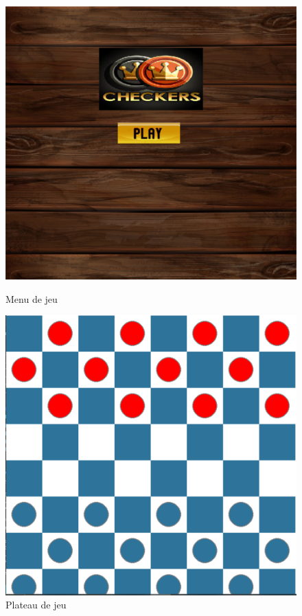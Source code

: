 \documentclass[12pt]{article}
\begin{document}
 \begin{figure}[h]
 	\centering
 	\begin{minipage}[b]{0.45\linewidth}
 		\centering
 		\includegraphics[width=\textwidth]{Capture.png}
 		\caption{Menu de jeu}
 	\end{minipage}
 	\hfill
 	\begin{minipage}[b]{0.45\linewidth}
 		\centering
 		\includegraphics[width=\textwidth]{Capture1.png}
 		\caption{Plateau de jeu}
 	\end{minipage}
 \end{figure}
\end{document}

